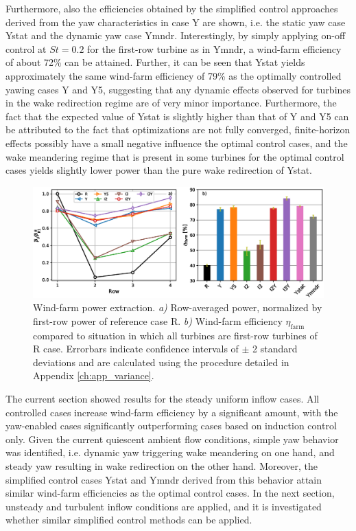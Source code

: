 	Furthermore, also the efficiencies obtained by the simplified control approaches derived from the yaw characteristics in case Y are shown, i.e. the static yaw case Ystat and the dynamic yaw case Ymndr. Interestingly, by simply applying on-off control at $St = 0.2$ for the first-row turbine as in Ymndr, a wind-farm efficiency of about 72\% can be attained.  Further, it can be seen that Ystat yields approximately the same wind-farm efficiency of 79\% as the optimally controlled yawing cases Y and Y5, suggesting that any dynamic effects observed for turbines in the wake redirection regime are of very minor importance. Furthermore, the fact that the expected value of Ystat is slightly higher than that of Y and Y5 can be attributed to the fact that optimizations are not fully converged, finite-horizon effects possibly have a small negative influence the optimal control cases, and the wake meandering regime that is present in some turbines for the optimal control cases yields slightly lower power than the pure wake redirection of Ystat. 
	
	
	\begin{figure}
		\includegraphics[width=\textwidth]{chapters/optimal_yaw_control/power_row_lam_eff.eps}
		\caption{Wind-farm power extraction. \emph{a) } Row-averaged power, normalized by first-row power of reference case R. \emph{b) } Wind-farm efficiency $\eta_{\text{farm}}$ compared to situation in which all turbines are first-row turbines of R case. Errorbars indicate confidence intervals of $\pm$ 2 standard deviations and are calculated using the procedure detailed in Appendix \ref{ch:app_variance}. \label{fig:power_uniform}}
	\end{figure}
	
	The current section showed results for the steady uniform inflow cases. All controlled cases increase wind-farm efficiency by a significant amount, with the yaw-enabled cases significantly outperforming cases based on induction control only. Given the current quiescent ambient flow conditions, simple yaw behavior was identified, i.e. dynamic yaw triggering wake meandering on one hand, and steady yaw resulting in wake redirection on the other hand. Moreover, the simplified control cases Ystat and Ymndr derived from this behavior attain similar wind-farm efficiencies as the optimal control cases. In the next section, unsteady and turbulent inflow conditions are applied, and it is investigated whether similar simplified control methods can be applied.

